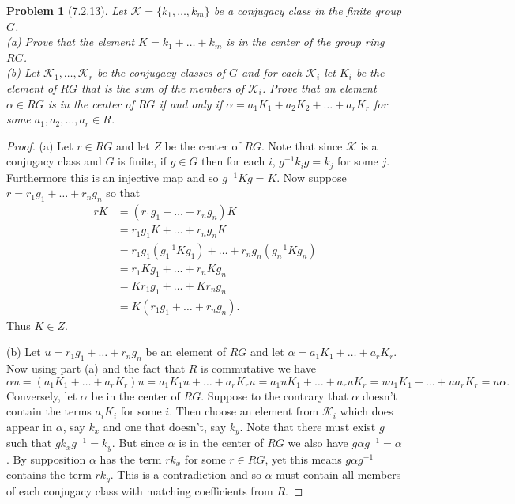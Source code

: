 \documentclass{article}
\newtheorem{problem}{Problem}
\begin{document}
\begin{problem}[7.2.13]
Let $\mathcal{K} = \{k_1, \dots , k_m\}$ be a conjugacy class in the finite group $G$.\\
(a) Prove that the element $K = k_1 + \dots + k_m$ is in the center of the group ring $RG$.\\
(b) Let $\mathcal{K}_1, \dots , \mathcal{K}_r$ be the conjugacy classes of $G$ and for each $\mathcal{K}_i$ let $K_i$ be the element of $RG$ that is the sum of the members of $\mathcal{K}_i$. Prove that an element $\alpha \in RG$ is in the center of $RG$ if and only if $\alpha = a_1K_1 + a_2K_2 + \dots + a_rK_r$ for some $a_1, a_2, \dots , a_r \in R$.
\end{problem}
\begin{proof}
(a) Let $r \in RG$ and let $Z$ be the center of $RG$. Note that since $\mathcal{K}$ is a conjugacy class and $G$ is finite, if $g \in G$ then for each $i$, $g^{-1}k_ig = k_j$ for some $j$. Furthermore this is an injective map and so $g^{-1}Kg = K$. Now suppose $r = r_1g_1 + \dots + r_ng_n$ so that
\begin{align*}
rK
&= (r_1g_1 + \dots + r_ng_n)K\\
&= r_1g_1K + \dots + r_ng_nK\\
&= r_1g_1(g_1^{-1}Kg_1) + \dots + r_ng_n(g_n^{-1}Kg_n)\\
&= r_1Kg_1 + \dots + r_nKg_n\\
&= Kr_1g_1 + \dots + Kr_ng_n\\
&= K(r_1g_1 + \dots + r_ng_n).
\end{align*}
Thus $K \in Z$.

(b) Let $u = r_1g_1 + \dots + r_ng_n$ be an element of $RG$ and let $\alpha = a_1K_1 + \dots + a_rK_r$. Now using part (a) and the fact that $R$ is commutative we have
\[
\alpha u = (a_1K_1 + \dots + a_rK_r)u = a_1K_1u + \dots + a_rK_ru = a_1uK_1 + \dots + a_ruK_r = ua_1K_1 + \dots + ua_rK_r = u \alpha.
\]
Conversely, let $\alpha$ be in the center of $RG$. Suppose to the contrary that $\alpha$ doesn't contain the terms $a_iK_i$ for some $i$. Then choose an element from $\mathcal{K}_i$ which does appear in $\alpha$, say $k_x$ and one that doesn't, say $k_y$. Note that there must exist $g$ such that $gk_xg^{-1} = k_y$. But since $\alpha$ is in the center of $RG$ we also have $g \alpha g^{-1} = \alpha$. By supposition $\alpha$ has the term $rk_x$ for some $r \in RG$, yet this means $g \alpha g^{-1}$ contains the term $rk_y$. This is a contradiction and so $\alpha$ must contain all members of each conjugacy class with matching coefficients from $R$.
\end{proof}
\end{document}
